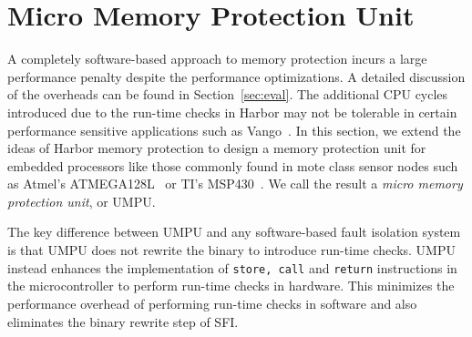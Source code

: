 \section{Micro Memory Protection Unit}
\label{sec:umpu}
%
A completely software-based approach to memory protection incurs a
large performance penalty despite the performance optimizations.
%
A detailed discussion of the overheads can be found in
Section~\ref{sec:eval}.
%
The additional CPU cycles introduced due to the run-time checks in
Harbor may not be tolerable in certain performance sensitive
applications such as Vango~\cite{ben06vango}.
%
In this section, we extend the ideas of Harbor memory protection to
design a memory protection unit for embedded processors like those
%
commonly found in mote class sensor nodes
%
such as Atmel's ATMEGA128L~\cite{avrdatasheet} or TI's
MSP430~\cite{mspdatasheet}.
%
We call the result a \emph{micro memory protection unit}, or UMPU.
%
%

The key difference between UMPU and any software-based fault isolation
system is that UMPU does not rewrite the binary to introduce run-time
checks.
%
UMPU instead enhances the implementation of \texttt{store, call} and
\texttt{return} instructions in the microcontroller to perform
run-time checks in hardware.
%
This minimizes the performance overhead of performing run-time checks
in software and also eliminates the binary rewrite step of SFI.

